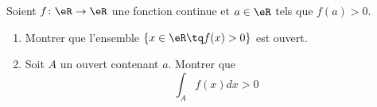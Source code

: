 
\begin{exercice}\label{exoExamDec2011-0002}

    Soient \( f\colon \eR\to \eR\) une fonction continue et \( a\in \eR\) tels que \( f(a)>0\).
    \begin{enumerate}
        \item
            Montrer que l'ensemble \( \{ x\in\eR\tq f(x)>0 \}\) est ouvert.
        \item
            Soit \( A\) un ouvert contenant \( a\). Montrer que
            \begin{equation}
                \int_Af(x)dx>0
            \end{equation}
    \end{enumerate}

\end{exercice}
